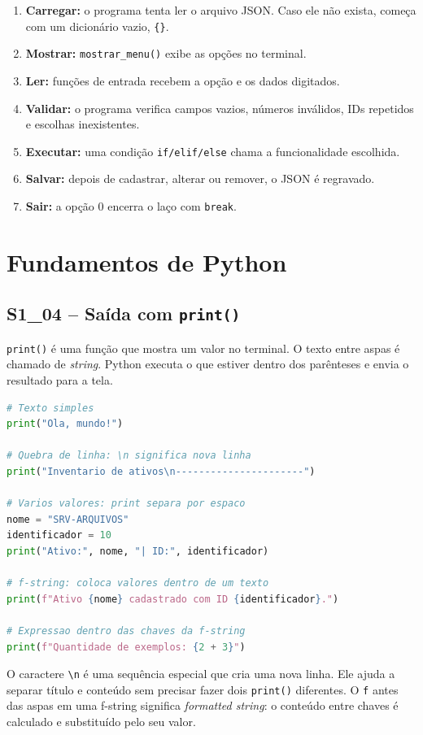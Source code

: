 \documentclass[11pt,a4paper]{article}
\newcommand{\cardsection}[1]{\Needspace{12\baselineskip}\subsection{#1}}
\begin{document}
\begin{enumerate}
  \item \textbf{Carregar:} o programa tenta ler o arquivo JSON. Caso ele não exista, começa com um dicionário vazio, \texttt{\{\}}.
  \item \textbf{Mostrar:} \texttt{mostrar\_menu()} exibe as opções no terminal.
  \item \textbf{Ler:} funções de entrada recebem a opção e os dados digitados.
  \item \textbf{Validar:} o programa verifica campos vazios, números inválidos, IDs repetidos e escolhas inexistentes.
  \item \textbf{Executar:} uma condição \texttt{if/elif/else} chama a funcionalidade escolhida.
  \item \textbf{Salvar:} depois de cadastrar, alterar ou remover, o JSON é regravado.
  \item \textbf{Sair:} a opção 0 encerra o laço com \texttt{break}.
\end{enumerate}

\section{Fundamentos de Python}

\cardsection{S1\_04 -- Saída com \texttt{print()}}

\texttt{print()} é uma função que mostra um valor no terminal. O texto entre aspas é chamado de \emph{string}. Python executa o que estiver dentro dos parênteses e envia o resultado para a tela.

\begin{lstlisting}[language=Python,caption={Formas básicas de usar print}]
# Texto simples
print("Ola, mundo!")

# Quebra de linha: \n significa nova linha
print("Inventario de ativos\n----------------------")

# Varios valores: print separa por espaco
nome = "SRV-ARQUIVOS"
identificador = 10
print("Ativo:", nome, "| ID:", identificador)

# f-string: coloca valores dentro de um texto
print(f"Ativo {nome} cadastrado com ID {identificador}.")

# Expressao dentro das chaves da f-string
print(f"Quantidade de exemplos: {2 + 3}")
\end{lstlisting}

O caractere \texttt{\textbackslash n} é uma sequência especial que cria uma nova linha. Ele ajuda a separar título e conteúdo sem precisar fazer dois \texttt{print()} diferentes. O \texttt{f} antes das aspas em uma f-string significa \emph{formatted string}: o conteúdo entre chaves é calculado e substituído pelo seu valor.
\end{document}
